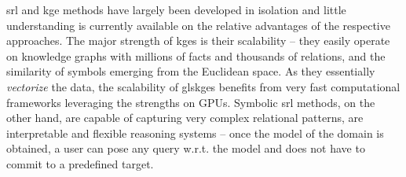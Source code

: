 







\gls{srl} and \gls{kge} methods have largely been developed in isolation and little understanding is currently available on the relative advantages of the respective approaches.
The major strength of \gls{kge}s is their scalability -- they easily operate on knowledge graphs with millions of facts and thousands of relations, and the similarity of symbols emerging from the Euclidean space.
As they essentially \textit{vectorize} the data, the scalability of gls{kge}s benefits from very fast computational frameworks leveraging the strengths on GPUs.
Symbolic \gls{srl} methods, on the other hand, are capable of capturing very complex relational patterns, are interpretable and flexible reasoning systems -- once the model of the domain is obtained, a user can pose any query w.r.t. the model and does not have to commit to a predefined target.



